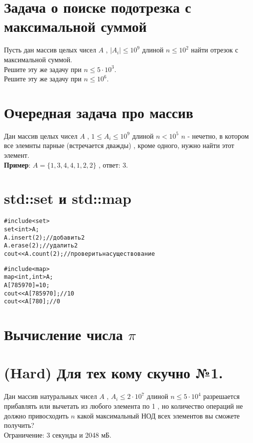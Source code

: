 \documentclass[10pt]{article}
\begin{document}
    \section{Задача о поиске подотрезка с максимальной суммой}
    Пусть дан массив целых чисел $A$ , $|A_i| \leq 10^9$  длиной $n \leq 10^2$ найти отрезок с максимальной суммой.
    \\
    Решите эту же задачу при $n \leq 5\cdot 10^3$.
    \\
    Решите эту же задачу при $n \leq 10^6$.
    \section{Очередная задача про массив}
    Дан массив целых чисел $A$ , $ 1\leq A_i \leq 10^9$ длиной $n < 10^5$ $n$ - нечетно, в котором все элемнты парные (встречается дважды) , кроме одного, нужно найти этот элемент.
    \\
    \textbf{Пример}: $A = \{1 , 3 , 4 , 4 , 1 , 2 , 2\}$ , ответ: 3.
    \section{std::set и std::map}
    \begin{alltt}
#include<set>
set<int> A;
A.insert(2); // добавить 2
A.erase(2); // удалить 2
cout << A.count(2); // проверить на существование 
    \end{alltt}
\begin{alltt}
#include<map>
map<int, int> A;
A[785970] = 10;
cout << A[785970]; // 10
cout << A[780]; // 0
    \end{alltt}
    \section{Вычисление числа \huge $\pi$ \normalsize}
    \section{(Hard) Для тех кому скучно №1.} 
    Дан массив натуральных чисел $A$ , $A_i \leq 2\cdot10^7$  длиной $n \leq 5\cdot10^4$ разрешается прибавлять или вычетать из любого элемента по 1 , но количество операций не должно привосходить $n$ какой максимальный НОД всех элементов вы сможете получить?
    \\
    Ограничение: 3 секунды и 2048 мБ.
    \\
    \\
    \\
    
\end{document}
